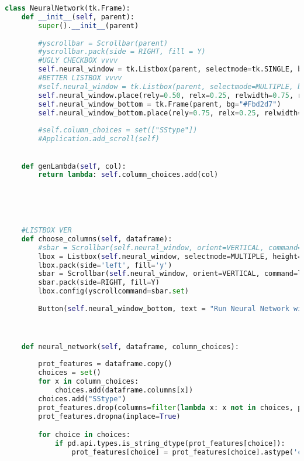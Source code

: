 \documentclass[12pt,letterpaper,oneside,reqno]{book}
\theoremstyle{plain}
\theoremstyle{definition}
\theoremstyle{plain}
\theoremstyle{remark}
\theoremstyle{plain}
\theoremstyle{definition}
\theoremstyle{plain}
\begin{document}
\begin{appendices}
\begin{lstlisting}[language=Python, label=lst:guifull, frame=single]
class NeuralNetwork(tk.Frame):
    def __init__(self, parent):
        super().__init__(parent)
        
        #yscrollbar = Scrollbar(parent)
        #yscrollbar.pack(side = RIGHT, fill = Y)
        #UGLY CHECKBOX vvvv
        self.neural_window = tk.Listbox(parent, selectmode=tk.SINGLE, bg="#ecb7bf", fg="white")
        #BETTER LISTBOX vvvv
        #self.neural_window = tk.Listbox(parent, selectmode=MULTIPLE, bg="black", fg="white", yscrollcommand = yscrollbar.set)
        self.neural_window.place(rely=0.50, relx=0.25, relwidth=0.75, relheight=0.25)
        self.neural_window_bottom = tk.Frame(parent, bg="#Fbd2d7")
        self.neural_window_bottom.place(rely=0.75, relx=0.25, relwidth=0.75, relheight=0.25)
        
        #self.column_choices = set(["SStype"])
        #Application.add_scroll(self)

        
    def genLambda(self, col):
        return lambda: self.column_choices.add(col) 

    
   


    #LISTBOX VER
    def choose_columns(self, dataframe):
        #sbar = Scrollbar(self.neural_window, orient=VERTICAL, command=lbox.view).pack(side=RIGHT, fill=Y)
        lbox = Listbox(self.neural_window, selectmode=MULTIPLE, height=40, width=109, listvariable=StringVar(value=list(dataframe.columns)))
        lbox.pack(side='left', fill='y')
        sbar = Scrollbar(self.neural_window, orient=VERTICAL, command=lbox.yview)
        sbar.pack(side=RIGHT, fill=Y)
        lbox.config(yscrollcommand=sbar.set)
        
        Button(self.neural_window_bottom, text = "Run Neural Network with These Chosen Columns", height=5, width=70, command=lambda: self.neural_network(dataframe, lbox.curselection()), bg= "white", fg= "#CD5E77").pack(expand= YES)



    def neural_network(self, dataframe, column_choices):
        
        prot_features = dataframe.copy()
        choices = set()
        for x in column_choices:
            choices.add(dataframe.columns[x])
        choices.add("SStype")
        prot_features.drop(columns=filter(lambda x: x not in choices, prot_features.columns), inplace=True)
        prot_features.dropna(inplace=True)

        for choice in choices:
            if pd.api.types.is_string_dtype(prot_features[choice]):
                prot_features[choice] = prot_features[choice].astype('category').cat.codes


\end{lstlisting}
\end{appendices}
\end{document}
